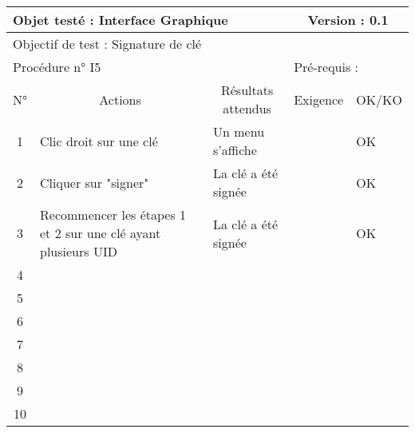 \documentclass{../res/univ-projet}
\begin{document}
\begin{center}
    \begin{tabular}{|c|p{5cm}|p{5cm}|p{1.5cm}|p{1.5cm}|}
      \hline
      \multicolumn{3}{|l|}{Objet testé : Interface Graphique} & \multicolumn{2}{c|}{Version : 0.1}\\ \hline
      \multicolumn{5}{|l|}{Objectif de test : Signature de clé}\\ \hline
      \multicolumn{3}{|l|}{Procédure n° I5} & \multicolumn{2}{p{3cm}|}{Pré-requis : }\\ \hline
      \multicolumn{1}{|c|}{N°} & \multicolumn{1}{c|}{Actions} & \multicolumn{1}{c|}{Résultats attendus} & 
      \multicolumn{1}{c|}{Exigence} & \multicolumn{1}{c|}{OK/KO}\\ \hline
      1 & Clic droit sur une clé & Un menu s'affiche &  & OK \\
      2 & Cliquer sur "signer" & La clé a été signée &  & OK\\
      3 & Recommencer les étapes 1 et 2 sur une clé ayant plusieurs UID & La clé a été signée &  & OK\\ 
      4 &  &  &  & \\
      5 &  &  &  & \\
      6 &  &  &  & \\
      7 &  &  &  & \\
      8 &  &  &  & \\
      9 &  &  &  & \\
      10 &  &  &  &\\ 
	\hline
    \end{tabular}
    \vskip 2.2cm


\end{center}
\end{document}
